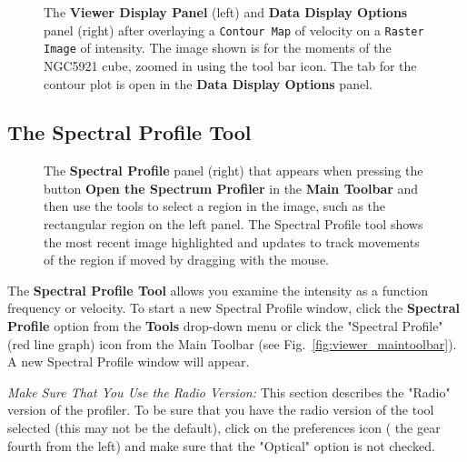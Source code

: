 \begin{figure}[h!]
\begin{center}
\caption{\label{fig:viewer_rascon} The {\bf Viewer Display Panel}
(left) and {\bf Data Display Options} panel (right) after overlaying
a {\tt Contour Map} of velocity on a {\tt Raster Image} of intensity.  The
image shown is for the moments of the NGC5921 cube, zoomed in using the tool bar icon.
The tab for the contour plot is open in the {\bf Data Display Options} 
panel.} 
\hrulefill
\end{center}
\end{figure}

\subsection{The Spectral Profile Tool}
\label{section:display.image.specprof}

\begin{figure}[h!]
\begin{center}
\caption{\label{fig:viewer_specprof} The {\bf Spectral Profile} panel (right)
that appears when pressing the button {\bf Open the Spectrum Profiler} in the
{\bf Main Toolbar} and then use the tools to select a region in the image,
such as the rectangular region on the left panel. The Spectral Profile tool
shows the most recent image highlighted and updates to track movements 
of the region if moved by dragging with the mouse.} 
\hrulefill
\end{center}
\end{figure}

The {\bf Spectral Profile Tool} allows you examine the intensity as a function
frequency or velocity. To start a new Spectral Profile window, click the 
{\bf Spectral Profile} option from the {\bf Tools} drop-down menu or click the 
"Spectral Profile" (red line graph) icon from the Main Toolbar 
(see Fig.~\ref{fig:viewer_maintoolbar}). A new Spectral Profile window will appear. 

{\em Make Sure That You Use the Radio Version:} This section describes the 
"Radio" version of the profiler. To be sure that you have the radio version of the tool
selected (this may not be the default), click on the preferences icon 
( the gear fourth from the left) and make sure that the "Optical" option is not checked.

